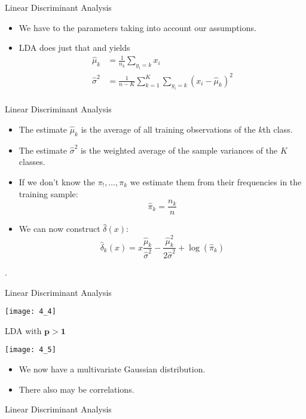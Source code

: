 \documentclass[mathserif, aspectratio=169]{beamer}
\begin{document}
\begin{frame}{Linear Discriminant Analysis}
	\begin{itemize}
		\item We have to  the parameters taking into account 
			our assumptions.
		\item LDA does just that and yields
			\begin{align*}
				\hat{\mu}_k &= \frac{1}{n_k}\sum_{y_i = k} x_i\\
				\hat{\sigma}^2 &= \frac{1}{n - K}
				\sum_{k=1}^{K}\sum_{y_i = k} (x_i - \hat{\mu}_k)^2\\
			\end{align*}
	\end{itemize}
\end{frame}

\begin{frame}{Linear Discriminant Analysis}
	\begin{itemize}
		\item The estimate $\hat{\mu}_k$ is the average of all training observations
			of the $k$th class.
		\item The estimate $\hat{\sigma}^2$ is the weighted average of the sample
			variances of the $K$ classes.
		\item If we don't know the $\pi_!, \dots, \pi_k$ we estimate them from their
			frequencies in the training sample:
			\[ \hat{\pi}_k = \frac{n_k}{n} \]
		\item We can now construct $\hat{\delta}(x)$:
			\[
				\hat{\delta}_k(x) =
				x \frac{\hat{\mu}_k}{\hat{\sigma}^2} 
				- \frac{\hat{\mu}_k^2}{2\hat{\sigma}^2}
				+ \log\left(\hat{\pi}_k\right)
			\]
	\end{itemize}
	.
\end{frame}

\begin{frame}{Linear Discriminant Analysis}
	\begin{center}
		\texttt{[image: 4\_4]}
	\end{center}
\end{frame}

\begin{frame}{LDA with $\bm{p > 1}$}
	\vspace{-10mm}
	\begin{center}
		\texttt{[image: 4\_5]}
	\end{center}
	\vspace{-5mm}
	\begin{itemize}
		\item We now have a multivariate Gaussian distribution.
		\item There also may be correlations.
	\end{itemize}


\end{frame}
\begin{frame}{Linear Discriminant Analysis}
	
\end{frame}
\end{document}
